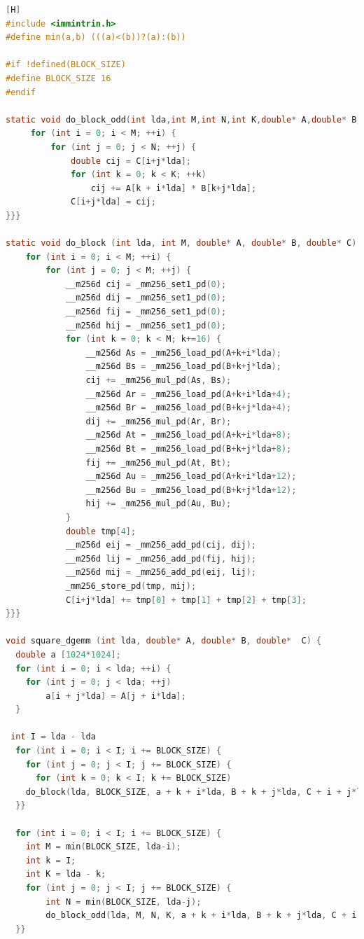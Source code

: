 \documentclass[10pt]{article}
\begin{document}
\begin{lstlisting}[language=C, basicstyle=\small][H]
#include <immintrin.h>
#define min(a,b) (((a)<(b))?(a):(b))

#if !defined(BLOCK_SIZE)
#define BLOCK_SIZE 16
#endif

static void do_block_odd(int lda,int M,int N,int K,double* A,double* B,double* C) {
     for (int i = 0; i < M; ++i) {
         for (int j = 0; j < N; ++j) {
             double cij = C[i+j*lda];
             for (int k = 0; k < K; ++k)
                 cij += A[k + i*lda] * B[k+j*lda];
             C[i+j*lda] = cij;
}}}

static void do_block (int lda, int M, double* A, double* B, double* C) {
    for (int i = 0; i < M; ++i) {
        for (int j = 0; j < M; ++j) {
            __m256d cij = _mm256_set1_pd(0);
            __m256d dij = _mm256_set1_pd(0);
            __m256d fij = _mm256_set1_pd(0);
            __m256d hij = _mm256_set1_pd(0);
            for (int k = 0; k < M; k+=16) {
                __m256d As = _mm256_load_pd(A+k+i*lda);
                __m256d Bs = _mm256_load_pd(B+k+j*lda);
                cij += _mm256_mul_pd(As, Bs);
                __m256d Ar = _mm256_load_pd(A+k+i*lda+4);
                __m256d Br = _mm256_load_pd(B+k+j*lda+4);
                dij += _mm256_mul_pd(Ar, Br);
                __m256d At = _mm256_load_pd(A+k+i*lda+8);
                __m256d Bt = _mm256_load_pd(B+k+j*lda+8);
                fij += _mm256_mul_pd(At, Bt);
                __m256d Au = _mm256_load_pd(A+k+i*lda+12);
                __m256d Bu = _mm256_load_pd(B+k+j*lda+12);
                hij += _mm256_mul_pd(Au, Bu);
            }
            double tmp[4];
            __m256d eij = _mm256_add_pd(cij, dij);
            __m256d lij = _mm256_add_pd(fij, hij);
            __m256d mij = _mm256_add_pd(eij, lij);
            _mm256_store_pd(tmp, mij);
            C[i+j*lda] += tmp[0] + tmp[1] + tmp[2] + tmp[3];
}}}

void square_dgemm (int lda, double* A, double* B, double*  C) {
  double a [1024*1024];
  for (int i = 0; i < lda; ++i) {
    for (int j = 0; j < lda; ++j)
        a[i + j*lda] = A[j + i*lda];
  }

 int I = lda - lda
  for (int i = 0; i < I; i += BLOCK_SIZE) {
    for (int j = 0; j < I; j += BLOCK_SIZE) {
      for (int k = 0; k < I; k += BLOCK_SIZE)
	do_block(lda, BLOCK_SIZE, a + k + i*lda, B + k + j*lda, C + i + j*lda);
  }}

  for (int i = 0; i < I; i += BLOCK_SIZE) {
    int M = min(BLOCK_SIZE, lda-i);
    int k = I;
    int K = lda - k;
    for (int j = 0; j < I; j += BLOCK_SIZE) {
        int N = min(BLOCK_SIZE, lda-j);
        do_block_odd(lda, M, N, K, a + k + i*lda, B + k + j*lda, C + i + j*lda);
  }}


\end{lstlisting}
\end{document}
